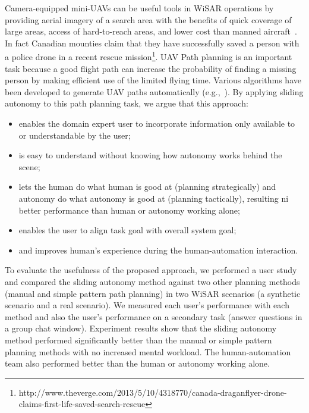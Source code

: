 \documentclass[journal]{IEEEtran}
\begin{document}
Camera-equipped mini-UAVs can be useful tools in WiSAR operations by providing aerial imagery of a search area with the benefits of quick coverage of large areas, access of hard-to-reach areas, and lower cost than manned aircraft~\cite{Murphy2008Cooperative, Goodrich2008Supporting}. In fact Canadian mounties claim that they have successfully saved a person with a police drone in a recent rescue mission\footnote{http://www.theverge.com/2013/5/10/4318770/canada-draganflyer-drone-claims-first-life-saved-search-rescue}. UAV Path planning is an important task because a good flight path can increase the probability of finding a missing person by making efficient use of the limited flying time. Various algorithms have been developed to generate UAV paths automatically (e.g.,~\cite{Bourgault2003Coordinated, Lin2009UAV, Lin2014Hierarchical}). By applying sliding autonomy to this path planning task, we argue that this approach:
\begin{itemize}
\item enables the domain expert user to incorporate information only available to or understandable by the user;
\item is easy to understand without knowing how autonomy works behind the scene;
\item lets the human do what human is good at (planning strategically) and autonomy do what autonomy is good at (planning tactically), resulting ni better performance than human or autonomy working alone;
\item enables the user to align task goal with overall system goal;
\item and improves human's experience during the human-automation interaction.
\end{itemize}

To evaluate the usefulness of the proposed approach, we performed a user study and compared the sliding autonomy method against two other planning methods (manual and simple pattern path planning) in two WiSAR scenarios (a synthetic scenario and a real scenario). We measured each user's performance with each method and also the user's performance on a secondary task (answer questions in a group chat window). Experiment results show that the sliding autonomy method performed significantly better than the manual or simple pattern planning methods with no increased mental workload. The human-automation team also performed better than the human or autonomy working alone.
\end{document}
